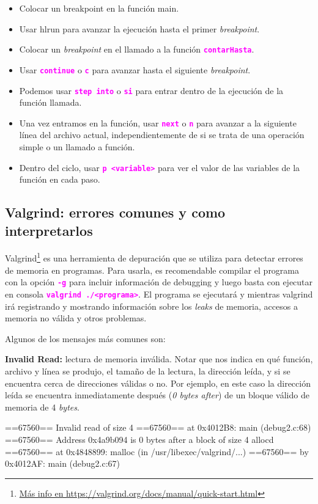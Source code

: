 \documentclass[]{scrartcl}
\newcommand{\hl}[1]{\textcolor{magenta}{\textbf{\texttt{#1}}}}
\begin{document}
\begin{itemize}
  \item Colocar un breakpoint en la función main.
  \item Usar hl{run} para avanzar la ejecución hasta el primer \textit{breakpoint}.
  \item Colocar un \textit{breakpoint} en el llamado a la función \hl{contarHasta}.
  \item Usar \hl{continue} o \hl{c} para avanzar hasta el siguiente \textit{breakpoint}.
  \item Podemos usar \hl{step into} o \hl{si} para entrar dentro de la ejecución de la función llamada. 
  \item Una vez entramos en la función, usar \hl{next} o \hl{n} para avanzar a la siguiente línea del archivo actual, independientemente de si se trata de una operación simple o un llamado a función.
  \item Dentro del ciclo, usar \hl{p <variable>} para ver el valor de las variables de la función en cada paso.
\end{itemize}

\subsection*{Valgrind: errores comunes y como interpretarlos}

Valgrind\footnote{\url{Más info en https://valgrind.org/docs/manual/quick-start.html}} es una herramienta de depuración que se utiliza para detectar errores de memoria en programas.
Para usarla, es recomendable compilar el programa con la opción \hl{-g} para incluir información de debugging y luego basta con ejecutar en consola \hl{valgrind ./<programa>}.
El programa se ejecutará y mientras valgrind irá registrando y mostrando información sobre los \textit{leaks} de memoria, accesos a memoria no válida y otros problemas.

Algunos de los mensajes más comunes son:

\textbf{Invalid Read:} lectura de memoria inválida. Notar que nos indica en qué función, archivo y línea se produjo, el tamaño de la lectura, la dirección leída, y si se encuentra cerca de direcciones válidas o no. Por ejemplo, en este caso la dirección leída se encuentra inmediatamente después (\textit{0 bytes after}) de un bloque válido de memoria de 4 \textit{bytes}.
\begin{bashbox}[]
  ==67560== Invalid read of size 4
  ==67560==    at 0x4012B8: main (debug2.c:68)
  ==67560==  Address 0x4a9b094 is 0 bytes after a block of size 4 allocd
  ==67560==    at 0x4848899: malloc (in /usr/libexec/valgrind/...)
  ==67560==    by 0x4012AF: main (debug2.c:67)
\end{bashbox}
\end{document}
